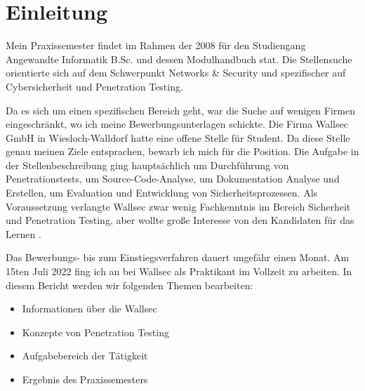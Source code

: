 \section{Einleitung}


Mein Praxissemester findet im Rahmen der  2008 für den Studiengang Angewandte Informatik B.Sc. und dessen Modulhandbuch \cite{Hochschule_Worms_FPO} stat. Die Stellensuche orientierte sich auf dem Schwerpunkt Networks \& Security und spezifischer auf Cybersicherheit und Penetration Testing. 

Da es sich um einen spezifischen Bereich geht, war die Suche auf wenigen Firmen eingeschränkt, wo ich meine Bewerbungsunterlagen schickte. Die Firma Wallsec GmbH in Wiesloch-Walldorf hatte eine offene Stelle für Student. Da diese Stelle genau meinen Ziele entsprachen, bewarb ich mich für die Position. Die Aufgabe in der Stellenbeschreibung ging hauptsächlich um Durchführung von Penetrationstests, um Source-Code-Analyse, um Dokumentation Analyse und Erstellen, um Evaluation und Entwicklung von Sicherheitsprozessen. Als Voraussetzung verlangte Wallsec zwar wenig Fachkenntnis im Bereich Sicherheit und Penetration Testing, aber wollte große Interesse von den Kandidaten für das Lernen \cite{Wallsec}.

Das Bewerbungs- bis zum Einstiegsverfahren dauert ungefähr einen Monat. Am 15ten Juli 2022 fing ich an bei Wallsec als Praktikant im Vollzeit zu arbeiten. In diesem Bericht werden wir folgenden Themen bearbeiten:

\begin{itemize}
   \item Informationen über die Wallsec
   \item Konzepte von Penetration Testing
   \item Aufgabebereich der Tätigkeit
   \item Ergebnis des Praxissemesters
\end{itemize}

